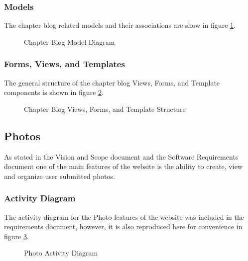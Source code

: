 \documentclass{article}
\begin{document}
\subsubsection{Models}

The chapter blog related models and their associations are show in figure \ref{fig:blogModelDiagram}.

\FloatBarrier
\begin{figure}[h!]
\centering
{}
\caption{Chapter Blog Model Diagram}
\label{fig:blogModelDiagram}
\end{figure}
\FloatBarrier

\subsubsection{Forms, Views, and Templates}

The general structure of the chapter blog Views, Forms, and Template components is shown in figure \ref{fig:chapterBlogViewFormTemplateDiagram}.

\FloatBarrier
\begin{figure}[h!]
\centering
{}
\caption{Chapter Blog Views, Forms, and Template Structure}
\label{fig:chapterBlogViewFormTemplateDiagram}
\end{figure}
\FloatBarrier

\subsection{Photos}

As stated in the Vision and Scope document and the Software Requirements document one of the main features of the website is the ability to create, view and organize user submitted photos.

\subsubsection{Activity Diagram}
The activity diagram for the Photo features of the website was included in the requirements document, however, it is also reproduced here for convenience in figure \ref{fig:photoActivityDiagram}.

\FloatBarrier
\begin{figure}[h!]
\centering
{}
\caption{Photo Activity Diagram}
\label{fig:photoActivityDiagram}
\end{figure}
\FloatBarrier
\end{document}
